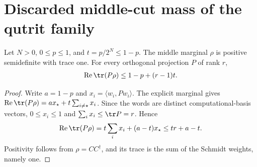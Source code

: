 \section{Discarded middle-cut mass of the qutrit family}

\begin{lemma}
    \label{thm:qutrit_middle_projection_bound}
    \leanok
    Let $N>0$, $0\le p\le1$, and $t=p/2^N\le1-p$.
    The middle marginal $\rho$ is positive semidefinite with trace one.
    For every orthogonal projection $P$ of rank $r$,
    \begin{align}
        \operatorname{Re}\tr(P\rho)\le1-p+(r-1)t.
        \label{eq:qutrit_middle_projection_bound}
    \end{align}
\end{lemma}
\begin{proof}\leanok
    Write $a=1-p$ and $x_i=\langle w_i,Pw_i\rangle$.
    The explicit marginal gives
    $\operatorname{Re}\tr(P\rho)=a x_\star+t\sum_{i\ne\star}x_i$.
    Since the words are distinct computational-basis vectors,
    $0\le x_i\le1$ and $\sum_i x_i\le\tr P=r$. Hence
    \begin{align}
        \operatorname{Re}\tr(P\rho)
        =t\sum_i x_i+(a-t)x_\star
        \le t r+a-t.
        \label{eq:qutrit_middle_projection_estimate}
    \end{align}
    Positivity follows from $\rho=CC^\dagger$, and its trace is the sum
    of the Schmidt weights, namely one.
\end{proof}

